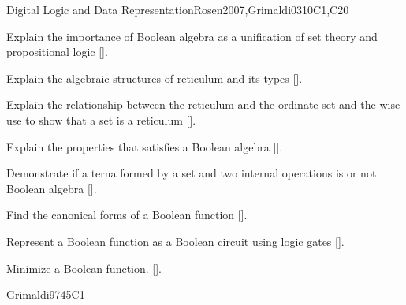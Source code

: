 \begin{syllabus}
\begin{unit}{Digital Logic and Data Representation}{}{Rosen2007,Grimaldi03}{10}{C1,C20}
    \begin{learningoutcomes}
     \item Explain the importance of Boolean algebra as a unification of set theory and propositional logic [\Assessment].
     \item Explain the algebraic structures of reticulum and its types [\Assessment].
     \item Explain the relationship between the reticulum and the ordinate set and the wise use to show that a set is a reticulum [\Assessment].
     \item Explain the properties that satisfies a Boolean algebra [\Assessment].
     \item Demonstrate if a terna formed by a set and two internal operations is or not Boolean algebra [\Assessment].
     \item Find the canonical forms of a Boolean function  [\Assessment].
     \item Represent a Boolean function as a Boolean circuit using logic gates  [\Assessment].
     \item Minimize a Boolean function. [\Assessment].
     \end{learningoutcomes}
  \end{unit}

\begin{unit}{\DSBasicsofCounting}{}{Grimaldi97}{45}{C1} 
    \begin{topics}
        \item \DSBasicsofCountingTopicCounting
        \item \DSBasicsofCountingTopicThePigeonhole
        \item \DSBasicsofCountingTopicPermutations
        \item \DSBasicsofCountingTopicSolving
        \item \DSBasicsofCountingTopicBasic
   \end{topics}
   \begin{learningoutcomes}
        \item \DSBasicsofCountingLOApplyCounting [\Familiarity]
        \item \DSBasicsofCountingLOApplyThe[\Familiarity]
        \item \DSBasicsofCountingLOComputePermutations[\Familiarity]
        \item \DSBasicsofCountingLOMap[\Familiarity]
        \item \DSBasicsofCountingLOSolveA[\Familiarity]
        \item \DSBasicsofCountingLOAnalyzeA[\Familiarity]
        \item \DSBasicsofCountingLOPerformComputations[\Familiarity]
   \end{learningoutcomes}
\end{unit}


\end{syllabus}
